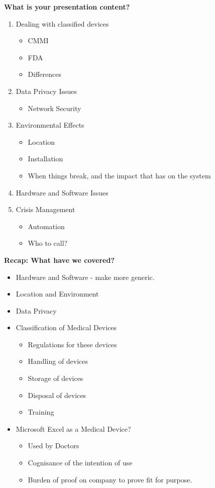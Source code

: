\textbf{What is your presentation content?}
\begin{enumerate}
\item Dealing with classified devices
\begin{itemize}
\item CMMI
\item FDA
\item Differences
\end{itemize}
\item Data Privacy Issues
\begin{itemize}
\item Network Security
\end{itemize}
\item Environmental Effects
\begin{itemize}
\item Location
\item Installation
\item When things break, and the impact that has on the system
\end{itemize}
\item Hardware and Software Issues
\item Crisis Management
\begin{itemize}
\item Automation
\item Who to call?
\end{itemize}
\end{enumerate}

\textbf{Recap: What have we covered?}
\begin{itemize}
\item Hardware and Software - make more generic.
\item Location and Environment
\item Data Privacy
\item Classification of Medical Devices
\begin{itemize}
\item Regulations for these devices
\item Handling of devices
\item Storage of devices
\item Disposal of devices
\item Training
\end{itemize}
\item Microsoft Excel as a Medical Device?
\begin{itemize}
\item Used by Doctors
\item Cognisance of the intention of use
\item Burden of proof on company to prove fit for purpose.
\end{itemize}
\end{itemize}

